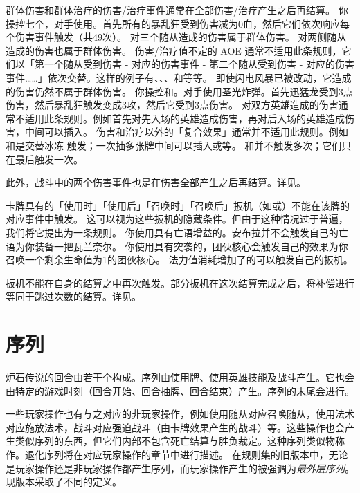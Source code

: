 群体伤害和群体治疗的伤害/治疗事件通常在全部伤害/治疗产生之后再结算。
\example 你操控七个，对手使用。首先所有的暴乱狂受到伤害减为0血，然后它们依次响应每个伤害事件触发（共49次）。
\notice {}对三个随从造成的伤害属于群体伤害。
\notice {}对两侧随从造成的伤害也属于群体伤害。
\notice 伤害/治疗值不定的 AOE 通常不适用此条规则，它们以「第一个随从受到伤害 - 对应的伤害事件 - 第二个随从受到伤害 - 对应的伤害事件……」依次交替。这样的例子有、、、和等等。
\exception 即使闪电风暴已被改动，它造成的伤害仍然不属于群体伤害。
\example 你操控和。对手使用圣光炸弹。首先迅猛龙受到3点伤害，然后暴乱狂触发变成3攻，然后它受到3点伤害。
\notice 对双方英雄造成的伤害通常不适用此条规则。例如首先对先入场的英雄造成伤害，再对后入场的英雄造成伤害，中间可以插入。
\notice 伤害和治疗以外的「复合效果」通常并不适用此规则。例如和是交替冰冻-触发；一次抽多张牌中间可以插入或等。
\notice {}和并不触发多次；它们只在最后触发一次。

此外，战斗中的两个伤害事件也是在伤害全部产生之后再结算。详见。

卡牌具有的「使用时」「使用后」「召唤时」「召唤后」扳机（如或）不能在该牌的对应事件中触发。
\notice 这可以视为这些扳机的隐藏条件。但由于这种情况过于普遍，我们将它提出为一条规则。
\example 你使用具有亡语增益的。安布拉并不会触发自己的亡语为你装备一把瓦兰奈尔。
\exception 你使用具有突袭的，团伙核心会触发自己的效果为你召唤一个剩余生命值为1的团伙核心。
\exception 法力值消耗增加了的可以触发自己的扳机。

扳机不能在自身的结算之中再次触发。部分扳机在这次结算完成之后，将补偿进行等同于跳过次数的结算。详见。

\section{序列}
\label{sequence}

炉石传说的回合由若干个构成。序列由使用牌、使用英雄技能及战斗产生。它也会由特定的游戏时刻（回合开始、回合抽牌、回合结束）产生。序列的末尾会进行。

一些玩家操作也有与之对应的非玩家操作，例如使用随从对应召唤随从，使用法术对应施放法术，战斗对应强迫战斗（由卡牌效果产生的战斗）等。这些操作也会产生类似序列的东西，但它们内部不包含死亡结算与胜负裁定。这种序列类似物称作。退化序列将在对应玩家操作的章节中进行描述。
\notice 在规则集的旧版本中，无论是玩家操作还是非玩家操作都产生序列，而玩家操作产生的被强调为\emph{最外层序列}。现版本采取了不同的定义。

